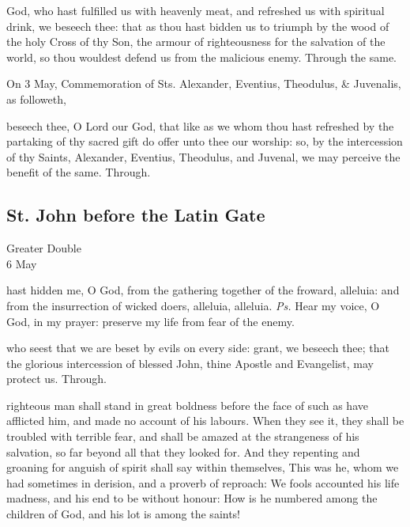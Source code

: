 
\postcommunion
{} God, who hast fulfilled us with heavenly meat, and refreshed us with spiritual drink, we beseech thee: that as thou hast bidden us to triumph by the wood of the holy Cross of thy Son, the armour of righteousness for the salvation of the world, so thou wouldest defend us from the malicious enemy. Through the same.
\begin{rubric}
	 On 3 May, Commemoration of Sts. Alexander, Eventius, Theodulus, \& Juvenalis, as followeth,
\end{rubric}
 beseech thee, O Lord our God, that like as we whom thou hast refreshed by the partaking of thy sacred gift do offer unto thee our worship: so, by the intercession of thy Saints, Alexander, Eventius, Theodulus, and Juvenal, we may perceive the benefit of the same. Through.


\clearpage
\subsection{St. John before the Latin Gate}
\begin{inhead}
    {Greater Double\\
6 May}
\end{inhead}

\introit
{} hast hidden me, O God, from the gathering together of the froward, alleluia: and from the insurrection of wicked doers, alleluia, alleluia. \textit{Ps.} Hear my voice, O God, in my prayer: preserve my life from fear of the enemy.

\collect
{} who seest that we are beset by evils on every side: grant, we beseech thee; that the glorious intercession of blessed John, thine Apostle and Evangelist, may protect us. Through.

 righteous man shall stand in great boldness before the face of such as have afflicted him, and made no account of his labours. When they see it, they shall be troubled with terrible fear, and shall be amazed at the strangeness of his salvation, so far beyond all that they looked for. And they repenting and groaning for anguish of spirit shall say within themselves, This was he, whom we had sometimes in derision, and a proverb of reproach: We fools accounted his life madness, and his end to be without honour: How is he numbered among the children of God, and his lot is among the saints!

